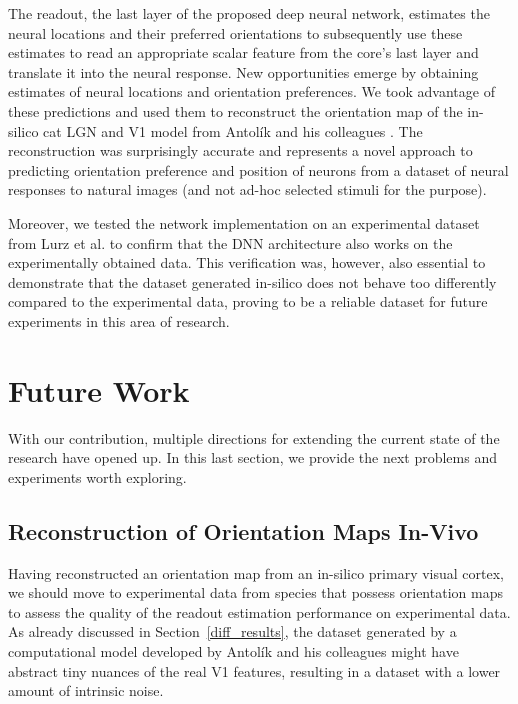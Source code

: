 The readout, the last layer of the proposed deep neural network, estimates the neural locations and their preferred orientations to subsequently use these estimates to read an appropriate scalar feature from the core’s last layer and translate it into the neural response. New opportunities emerge by obtaining estimates of neural locations and orientation preferences. We took advantage of these predictions and used them to reconstruct the orientation map of the in-silico cat LGN and V1 model from Antolík and his colleagues \citep{antolik2019comprehensive}. The reconstruction was surprisingly accurate and represents a novel approach to predicting orientation preference and position of neurons from a dataset of neural responses to natural images (and not ad-hoc selected stimuli for the purpose).

Moreover, we tested the network implementation on an experimental dataset from Lurz et al. \citep{lurz2021generalization} to confirm that the DNN architecture also works on the experimentally obtained data. This verification was, however, also essential to demonstrate that the dataset generated in-silico does not behave too differently compared to the experimental data, proving to be a reliable dataset for future experiments in this area of research.

\section*{Future Work}

With our contribution, multiple directions for extending the current state of the research have opened up. In this last section, we provide the next problems and experiments worth exploring.


\subsection*{Reconstruction of Orientation Maps In-Vivo}

Having reconstructed an orientation map from an in-silico primary visual cortex, we should move to experimental data from species that possess orientation maps to assess the quality of the readout estimation performance on experimental data. As already discussed in Section~\ref{diff_results}, the dataset generated by a computational model developed by Antolík and his colleagues \citep{antolik2019comprehensive} might have abstract tiny nuances of the real V1 features, resulting in a dataset with a lower amount of intrinsic noise.



